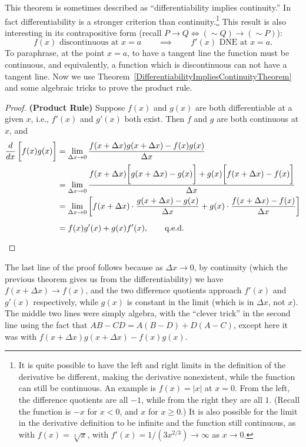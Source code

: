This theorem is sometimes described as ``differentiability
implies continuity.''  In fact differentiability is a stronger
criterion than continuity.\footnote{%
It is quite possible to have
the left and right limits in the definition of the derivative
be different, making the derivative nonexistent, while
the function can still be continuous.  An example is
$f(x)=|x|$ at $x=0$.  From the left, the difference 
quotients are all $-1$, while from the right they are all
$1$.  (Recall the function is $-x$ for $x<0$, and $x$ for $x\ge0$.)
It is also possible for the limit in the derivative definition
to be infinite and the
function still continuous, as with $f(x)=\sqrt[3]{x}$, with 
$f'(x)=1/(3x^{2/3})\longrightarrow\infty$ as $x\to0$.}
 This result is also interesting in its contrapositive form
(recall $P\rightarrow Q\iff(\sim Q)\rightarrow(\sim P)$):
$$f(x)\text{ discontinuous at }x=a
\qquad\implies\qquad f'(x)\text{ DNE at }x=a.$$
To paraphrase, at the point $x=a$, to have a tangent
line the function must be continuous, and equivalently, 
a function which is 
discontinuous can not have a tangent line.
Now we use Theorem~\ref{DifferentiabilityImpliesContinuityTheorem}
and some algebraic tricks to prove the product rule.


\begin{proof}{\bf(Product Rule)} Suppose $f(x)$ and $g(x)$
are both differentiable at a given $x$, i.e., $f'(x)$ and $g'(x)$
both exist.  Then $f$ and $g$ are both continuous at $x$, and
\begin{align*}
\frac{d}{dx}\left[\vphantom{\frac22}f(x)g(x)\right]
&=\lim_{\Delta x\to0}\frac{f(x+\Delta x)g(x+\Delta x)-f(x)g(x)}{\Delta x}\\
&=\lim_{\Delta x\to0}
\frac{f(x+\Delta x)\biggl[g(x+\Delta x)-g(x)\biggr]
   +g(x)\biggl[f(x+\Delta x)-f(x)\biggr]}
{\Delta x}\\ 
&=\lim_{\Delta x\to0}\left[f(x+\Delta x)\cdot
               \frac{g(x+\Delta x)-g(x)}{\Delta x}+
g(x)\cdot\frac{f(x+\Delta x)-f(x)}{\Delta x}\right]\\ 
&=\vphantom{\frac{X}X}f(x)g'(x)+g(x)f'(x),\qquad\text{q.e.d.}
\end{align*}\end{proof}
The last line of the proof follows because
 as $\Delta x\to0$, by continuity (which the previous theorem
gives us from the differentiability) we have $f(x+\Delta x)\to f(x)$,
and the two difference quotients approach $f'(x)$ and $g'(x)$
respectively, while $g(x)$ is constant in the limit
(which is in $\Delta x$, not $x$).
The middle two lines were simply algebra, with the
``clever trick'' in the second line 
using the fact that $AB-CD=A(B-D)+D(A-C)$, except
here it was with $f(x+\Delta x)g(x+\Delta x)-f(x)g(x)$.
